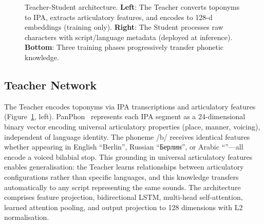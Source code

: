 \documentclass[11pt,a4paper]{article}
\newcommand{\textar}[1]{{\arabicfont\RL{#1}}}
\newcommand{\embdim}{128}
\begin{document}
\begin{figure}[ht]
\caption{Teacher-Student architecture. \textbf{Left}: The Teacher converts toponyms to IPA, extracts articulatory features, and encodes to 128-d embeddings (training only). \textbf{Right}: The Student processes raw characters with script/language metadata (deployed at inference). \textbf{Bottom}: Three training phases progressively transfer phonetic knowledge.}
\label{fig:architecture}
\end{figure}

\subsection{Teacher Network}
\label{subsec:teacher}

The Teacher encodes toponyms via IPA transcriptions and articulatory features (Figure~\ref{fig:architecture}, left). PanPhon~\citep{mortensen2016} represents each IPA segment as a 24-dimensional binary vector encoding universal articulatory properties (place, manner, voicing), independent of language identity. The phoneme /b/ receives identical features whether appearing in English ``Berlin'', Russian ``Берлин'', or Arabic ``\textar{برلين}''---all encode a voiced bilabial stop. This grounding in universal articulatory features enables generalisation: the Teacher learns relationships between articulatory configurations rather than specific languages, and this knowledge transfers automatically to any script representing the same sounds. The architecture comprises feature projection, bidirectional LSTM, multi-head self-attention, learned attention pooling, and output projection to \embdim{} dimensions with L2 normalisation.
\end{document}
